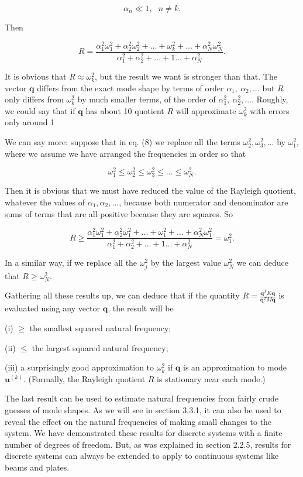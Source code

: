   $$\alpha_n \ll 1,~~~n \ne k .\tag{7}$$ 

  Then 

  $$R=\frac{\alpha_1^2 \omega_1^2 + \alpha_2^2 \omega_2^2 + \dots+ \omega_k^2 + 
  \dots + \alpha_N^2 \omega_N^2 }{\alpha_1^2 + \alpha_2^2 + \dots + 1 \dots + 
  \alpha_N^2 } .\tag{8}$$ 

  It is obvious that $R \approx \omega_k^2$, but the result we want is stronger 
  than that. The vector $\mathbf{q}$ differs from the exact mode shape by terms 
  of order $\alpha_1,~\alpha_2, \dots$ but $R$ only differs from $\omega_k^2$ 
  by much smaller terms, of the order of $\alpha_1^2,~\alpha_2^2, \dots$. 
  Roughly, we could say that if $\mathbf{q}$ has about 10%
  quotient $R$ will approximate $\omega_k^2$ with errors only around 1%

  We can say more: suppose that in eq. (8) we replace all the terms 
  $\omega_2^2, \omega_3^2, \dots$ by $\omega_1^2$, where we assume we have 
  arranged the frequencies in order so that 

  $$\omega_1^2 \le \omega_2^2 \le \omega_3^2 \le \dots \le \omega_N^2 
  .\tag{9}$$ 

  Then it is obvious that we must have reduced the value of the Rayleigh 
  quotient, whatever the values of $\alpha_1, \alpha_2, \dots$, because both 
  numerator and denominator are sums of terms that are all positive because 
  they are squares. So 

  $$R \ge \frac{\alpha_1^2 \omega_1^2 + \alpha_2^2 \omega_1^2 + \dots+ 
  \omega_1^2 + \dots + \alpha_N^2 \omega_1^2 }{\alpha_1^2 + \alpha_2^2 + \dots 
  + 1 \dots + \alpha_N^2} = \omega_1^2 .\tag{10}$$ 

  In a similar way, if we replace all the $\omega_j^2$ by the largest value 
  $\omega_N^2$ we can deduce that $R \ge \omega_N^2$. 

  Gathering all these results up, we can deduce that if the quantity 
  $R=\frac{\mathbf{q}^T K \mathbf{q}}{\mathbf{q}^T M \mathbf{q}}$ is evaluated 
  using any vector $\mathbf{q}$, the result will be 

  (i) $\ge$ the smallest squared natural frequency; 

  (ii) $\le$ the largest squared natural frequency; 

  (iii) a surprisingly good approximation to $\omega_k^2$ if $\mathbf{q}$ is an 
  approximation to mode $\mathbf{u}^{(k)}$. (Formally, the Rayleigh quotient 
  $R$ is stationary near each mode.) 

  The last result can be used to estimate natural frequencies from fairly crude 
  guesses of mode shapes. As we will see in section 3.3.1, it can also be used 
  to reveal the effect on the natural frequencies of making small changes to 
  the system. We have demonstrated these results for discrete systems with a 
  finite number of degrees of freedom. But, as was explained in section 2.2.5, 
  results for discrete systems can always be extended to apply to continuous 
  systems like beams and plates. 